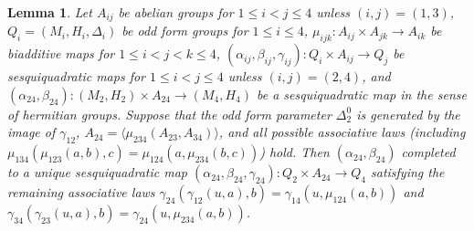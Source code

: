 \documentclass{article}
\newtheorem{lemma}{Lemma}
\theoremstyle{definition}
\begin{document}
\begin{lemma} \label{act-cons}
    Let \(A_{ij}\) be abelian groups for \(
        1 \leq i < j \leq 4
    \) unless \(
        (i, j) = (1, 3)
    \), \(
        Q_i = (M_i, H_i, \Delta_i)
    \) be odd form groups for \(
        1 \leq i \leq 4
    \), \(
        \mu_{ijk}
        \colon A_{ij} \times A_{jk}
        \to A_{ik}
    \) be biadditive maps for \(
        1 \leq i < j < k \leq 4
    \), \(
        (\alpha_{ij}, \beta_{ij}, \gamma_{ij})
        \colon Q_i \times A_{ij}
        \to Q_j
    \) be sesquiquadratic maps for \(
        1 \leq i < j \leq 4
    \) unless \(
        (i, j) = (2, 4)
    \), and \(
        (\alpha_{24}, \beta_{24})
        \colon (M_2, H_2) \times A_{24}
        \to (M_4, H_4)
    \) be a sesquiquadratic map in the sense of hermitian groups. Suppose that the odd form parameter \(\Delta^0_2\) is generated by the image of \(\gamma_{12}\), \(
        A_{24} = \langle
            \mu_{234}(A_{23}, A_{34})
        \rangle
    \), and all possible associative laws (including \(
        \mu_{134}(\mu_{123}(a, b), c)
        =
        \mu_{124}(a, \mu_{234}(b, c))
    \)) hold. Then \((\alpha_{24}, \beta_{24})\) completed to a unique sesquiquadratic map \(
        (\alpha_{24}, \beta_{24}, \gamma_{24})
        \colon Q_2 \times A_{24}
        \to Q_4
    \) satisfying the remaining associative laws \(
        \gamma_{24}(\gamma_{12}(u, a), b)
        =
        \gamma_{14}(u, \mu_{124}(a, b))
    \) and \(
        \gamma_{34}(\gamma_{23}(u, a), b)
        =
        \gamma_{24}(u, \mu_{234}(a, b))
    \).
\end{lemma}
\end{document}
